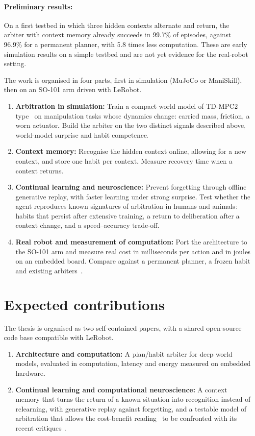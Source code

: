 \documentclass[11pt,a4paper]{article}
\begin{document}
\paragraph{Preliminary results:} On a first testbed in which three hidden contexts alternate and return, the arbiter with context memory already succeeds in 99.7\% of episodes, against 96.9\% for a permanent planner, with 5.8 times less computation. These are early simulation results on a simple testbed and are not yet evidence for the real-robot setting.

The work is organised in four parts, first in simulation (MuJoCo or ManiSkill), then on an SO-101 arm driven with LeRobot.

\begin{enumerate}
\item \textbf{Arbitration in simulation:} Train a compact world model of TD-MPC2 type~\cite{hansen2024tdmpc2} on manipulation tasks whose dynamics change: carried mass, friction, a worn actuator. Build the arbiter on the two distinct signals described above, world-model surprise and habit competence.

\item \textbf{Context memory:} Recognise the hidden context online, allowing for a new context, and store one habit per context. Measure recovery time when a context returns.

\item \textbf{Continual learning and neuroscience:} Prevent forgetting through offline generative replay, with faster learning under strong surprise. Test whether the agent reproduces known signatures of arbitration in humans and animals: habits that persist after extensive training, a return to deliberation after a context change, and a speed--accuracy trade-off.

\item \textbf{Real robot and measurement of computation:} Port the architecture to the SO-101 arm and measure real cost in milliseconds per action and in joules on an embedded board. Compare against a permanent planner, a frozen habit and existing arbiters~\cite{dromnelle2023reducing,labiosa2026when}.
\end{enumerate}

\section{Expected contributions}
The thesis is organised as two self-contained papers, with a shared open-source code base compatible with LeRobot.
\begin{enumerate}
\item \textbf{Architecture and computation:} A plan/habit arbiter for deep world models, evaluated in computation, latency and energy measured on embedded hardware.
\item \textbf{Continual learning and computational neuroscience:} A context memory that turns the return of a known situation into recognition instead of relearning, with generative replay against forgetting, and a testable model of arbitration that allows the cost-benefit reading~\cite{kool2017cost} to be confronted with its recent critiques~\cite{fehersilva2023rethinking}.
\end{enumerate}
\end{document}
